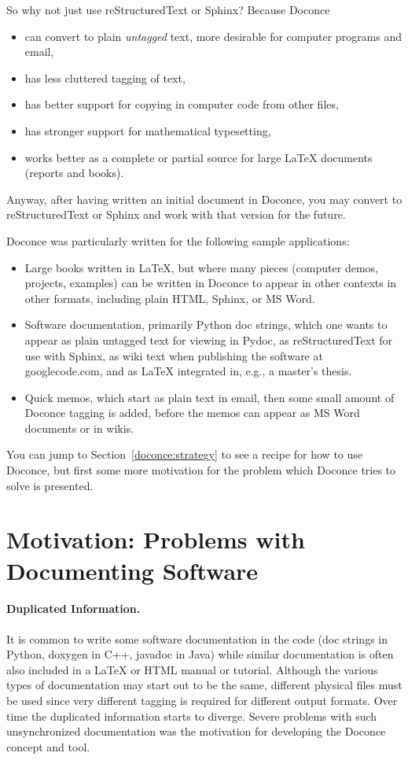 \documentclass{article}
\begin{document}
So why not just use reStructuredText or Sphinx? Because Doconce

\begin{itemize}
  \item can convert to plain \emph{untagged} text, 
    more desirable for computer programs and email, 
  \item has less cluttered tagging of text,
  \item has better support for copying in computer code from other files,
  \item has stronger support for mathematical typesetting,
  \item works better as a complete or partial source for large {\LaTeX} 
    documents (reports and books).
\end{itemize}
Anyway, after having written an initial document in Doconce, you may
convert to reStructuredText or Sphinx and work with that version for
the future.

Doconce was particularly written for the following sample applications:

\begin{itemize}
  \item Large books written in {\LaTeX}, but where many pieces (computer demos,
    projects, examples) can be written in Doconce to appear in other
    contexts in other formats, including plain HTML, Sphinx, or MS Word.
  \item Software documentation, primarily Python doc strings, which one wants
    to appear as plain untagged text for viewing in Pydoc, as reStructuredText
    for use with Sphinx, as wiki text when publishing the software at
    googlecode.com, and as {\LaTeX} integrated in, e.g., a master's thesis.
  \item Quick memos, which start as plain text in email, then some small
    amount of Doconce tagging is added, before the memos can appear as
    MS Word documents or in wikis.
\end{itemize}
You can jump to Section~\ref{doconce:strategy} to see a recipe for
how to use Doconce, but first some more motivation for
the problem which Doconce tries to solve is presented.


\section{Motivation: Problems with Documenting Software}


\paragraph{Duplicated Information.}
It is common to write some software
documentation in the code (doc strings in Python, doxygen in C++,
javadoc in Java) while similar documentation is often also included in
a {\LaTeX} or HTML manual or tutorial. Although the various types of
documentation may start out to be the same, different physical files
must be used since very different tagging is required for different
output formats. Over time the duplicated information starts to
diverge. Severe problems with such unsynchronized documentation was
the motivation for developing the Doconce concept and tool.
\end{document}
